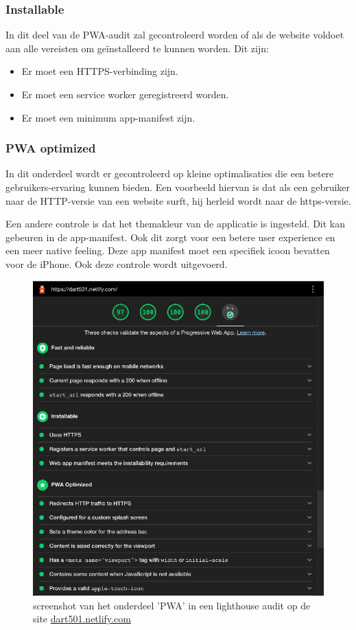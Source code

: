 	
	\subsubsection{Installable}
	
		In dit deel van de PWA-audit zal gecontroleerd worden of als de website voldoet aan alle vereisten om geïnstalleerd te kunnen worden. Dit zijn:
		\begin{itemize}
			\item	Er moet een HTTPS-verbinding zijn.
			\item	Er moet een service worker geregistreerd worden.
			\item	Er moet een minimum app-manifest zijn.
		\end{itemize}
		\autocite{web.dev2020a}
		
	
	\subsubsection{PWA optimized}
	
		In dit onderdeel wordt er gecontroleerd op kleine optimalisaties die een betere gebruikers-ervaring kunnen bieden. 
		Een voorbeeld hiervan is dat als een gebruiker naar de HTTP-versie van een website surft, hij herleid wordt naar de https-versie.
		
		Een andere controle is dat het themakleur van de applicatie is ingesteld. Dit kan gebeuren in de app-manifest. Ook dit zorgt voor een betere user experience en een meer native feeling. Deze app manifest moet een specifiek icoon bevatten voor de iPhone. Ook deze controle wordt uitgevoerd.
		
		
		\begin{figure}[H]
			\centering
			\includegraphics{./img/lighthouse.png}
			\caption{screenshot van het onderdeel 'PWA' in een lighthouse audit op de site \href{ https://dart501.netlify.com}{dart501.netlify.com} }
		\end{figure}
		
